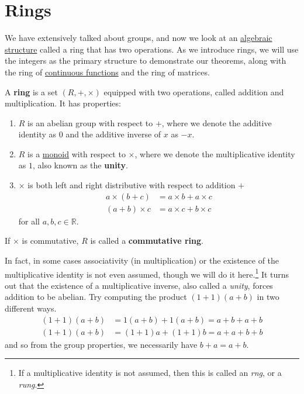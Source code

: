 \section{Rings} 

  We have extensively talked about groups, and now we look at an \hyperref[def:algebraic-structure]{algebraic structure} called a ring that has two operations. As we introduce rings, we will use the integers as the primary structure to demonstrate our theorems, along with the ring of \hyperref[pst-def:continuous_func]{continuous functions} and the ring of matrices. 

  \begin{definition}[Ring]
    \label{def:ring}
    A \textbf{ring} is a set $(R, +, \times)$ equipped with two operations, called addition and multiplication. It has properties: 
    \begin{enumerate}
      \item $R$ is an abelian group with respect to $+$, where we denote the additive identity as $0$ and the additive inverse of $x$ as $-x$. 
      \item $R$ is a \hyperref[def:monoid]{monoid} with respect to $\times$, where we denote the multiplicative identity as $1$, also known as the \textbf{unity}. 
      \item $\times$ is both left and right distributive with respect to addition $+$
      \begin{align}
        a \times (b + c) & = a\times b + a\times c \\ 
        (a + b) \times c & = a\times c + b\times c 
      \end{align}
      for all $a, b, c \in \mathbb{R}$. 
    \end{enumerate} 
    If $\times$ is commutative, $R$ is called a \textbf{commutative ring}. 
  \end{definition}

  In fact, in some cases associativity (in multiplication) or the existence of the multiplicative identity is not even assumed, though we will do it here.\footnote{If a multiplicative identity is not assumed, then this is called an \textit{rng}, or a \textit{rung}.} It turns out that the existence of a multiplicative inverse, also called a \textit{unity}, forces addition to be abelian. Try computing the product $(1 + 1)(a + b)$ in two different ways. 
  \begin{align}
    (1 + 1)(a + b) & = 1(a + b) + 1(a + b) = a + b + a + b \\
    (1 + 1)(a + b) & = (1 + 1)a + (1 + 1)b = a + a + b + b
  \end{align}
  and so from the group properties, we necessarily have $b + a = a + b$. 

